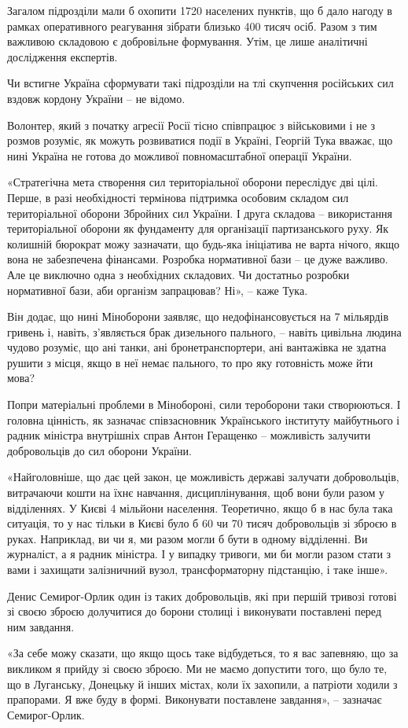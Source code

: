 Загалом підрозділи мали б охопити 1720 населених пунктів, що б дало нагоду в
рамках оперативного реагування зібрати близько 400 тисяч осіб. Разом з тим
важливою складовою є добровільне формування. Утім, це лише аналітичні
дослідження експертів.

Чи встигне Україна сформувати такі підрозділи на тлі скупчення російських сил
вздовж кордону України – не відомо.

Волонтер, який з початку агресії Росії тісно співпрацює з військовими і не з
розмов розуміє, як можуть розвиватися події в Україні, Георгій Тука вважає, що
нині Україна не готова до можливої повномасштабної операції України.

«Стратегічна мета створення сил територіальної оборони переслідує дві цілі.
Перше, в разі необхідності термінова підтримка особовим складом сил
територіальної оборони Збройних сил України. І друга складова – використання
територіальної оборони як фундаменту для організації партизанського руху. Як
колишній бюрократ можу зазначати, що будь-яка ініціатива не варта нічого, якщо
вона не забезпечена фінансами. Розробка нормативної бази – це дуже важливо. Але
це виключно одна з необхідних складових. Чи достатньо розробки нормативної
бази, аби організм запрацював? Ні», – каже Тука.

Він додає, що нині Міноборони заявляє, що недофінансовується на 7 мільярдів
гривень і, навіть, з’являється брак дизельного пального, – навіть цивільна
людина чудово розуміє, що ані танки, ані бронетранспортери, ані вантажівка не
здатна рушити з місця, якщо в неї немає пального, то про яку готовність може
йти мова?


Попри матеріальні проблеми в Мінобороні, сили тероборони таки створюються. І
головна цінність, як зазначає співзасновник Українського інституту майбутнього
і радник міністра внутрішніх справ Антон Геращенко – можливість залучити
добровольців до сил оборони України.

«Найголовніше, що дає цей закон, це можливість державі залучати добровольців,
витрачаючи кошти на їхнє навчання, дисциплінування, щоб вони були разом у
відділеннях. У Києві 4 мільйони населення. Теоретично, якщо б в нас була така
ситуація, то у нас тільки в Києві було б 60 чи 70 тисяч добровольців зі зброєю
в руках. Наприклад, ви чи я, ми разом могли б бути в одному відділенні. Ви
журналіст, а я радник міністра. І у випадку тривоги, ми би могли разом стати з
вами і захищати залізничний вузол, трансформаторну підстанцію, і таке інше».


Денис Семирог-Орлик один із таких добровольців, які при першій тривозі готові
зі своєю зброєю долучитися до борони столиці і виконувати поставлені перед ним
завдання.

«За себе можу сказати, що якщо щось таке відбудеться, то я вас запевняю, що за
викликом я прийду зі своєю зброєю. Ми не маємо допустити того, що було те, що в
Луганську, Донецьку й інших містах, коли їх захопили, а патріоти ходили з
прапорами. Я вже буду в формі. Виконувати поставлене завдання», – зазначає
Семирог-Орлик.
